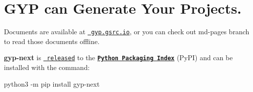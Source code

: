 \chapter{GYP can Generate Your Projects.}
\hypertarget{md_backend_2node__modules_2node-gyp_2gyp_2_r_e_a_d_m_e}{}\label{md_backend_2node__modules_2node-gyp_2gyp_2_r_e_a_d_m_e}
Documents are available at \href{https://gyp.gsrc.io}{\texttt{ gyp.\+gsrc.\+io}}, or you can check out {\ttfamily md-\/pages} branch to read those documents offline.

{\bfseries{gyp-\/next}} is \href{https://github.com/nodejs/gyp-next/releases}{\texttt{ released}} to the \href{https://pypi.org/project/gyp-next}{\texttt{ {\bfseries{Python Packaging Index}}}} (Py\+PI) and can be installed with the command\+:
\begin{DoxyItemize}
\item {\ttfamily python3 -\/m pip install gyp-\/next} 
\end{DoxyItemize}